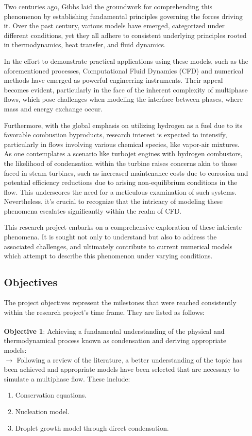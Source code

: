 \documentclass[12pt]{article}
\numberwithin{equation}{section}
\begin{document}
Two centuries ago, Gibbs laid the groundwork for comprehending this phenomenon by establishing fundamental principles governing the forces driving it. Over the past century, various models have emerged, categorized under different conditions, yet they all adhere to consistent underlying principles rooted in thermodynamics, heat transfer, and fluid dynamics.

In the effort to demonstrate practical applications using these models, such as the aforementioned processes, Computational Fluid Dynamics (CFD) and numerical methods have emerged as powerful engineering instruments. Their appeal becomes evident, particularly in the face of the inherent complexity of multiphase flows, which pose challenges when modeling the interface between phases, where mass and energy exchange occur.

Furthermore, with the global emphasis on utilizing hydrogen as a fuel due to its favorable combustion byproducts, research interest is expected to intensify, particularly in flows involving various chemical species, like vapor-air mixtures. As one contemplates a scenario like turbojet engines with hydrogen combustors, the likelihood of condensation within the turbine raises concerns akin to those faced in steam turbines, such as increased maintenance costs due to corrosion and potential efficiency reductions due to arising non-equilibrium conditions in the flow. This underscores the need for a meticulous examination of such systems. Nevertheless, it's crucial to recognize that the intricacy of modeling these phenomena escalates significantly within the realm of CFD.

This research project embarks on a comprehensive exploration of these intricate phenomena. It is sought not only to understand but also to address the associated challenges, and ultimately contribute to current numerical models which attempt to describe this phenomenon under varying conditions.
\subsection{Objectives}
The project objectives represent the milestones that were reached consistently within the research project's time frame. They are listed as follows:\\\\
\noindent
\textbf{Objective 1}: Achieving a fundamental understanding of the physical and thermodynamical process known as condensation and deriving appropriate models:\\
$\rightarrow$ Following a review of the literature, a better understanding of the topic has been achieved and appropriate models have been selected that are necessary to simulate a multiphase flow. These include:
\begin{enumerate}
        \item Conservation equations.
        \item Nucleation model.
        \item Droplet growth model through direct condensation.
\end{enumerate} 
\end{document}
